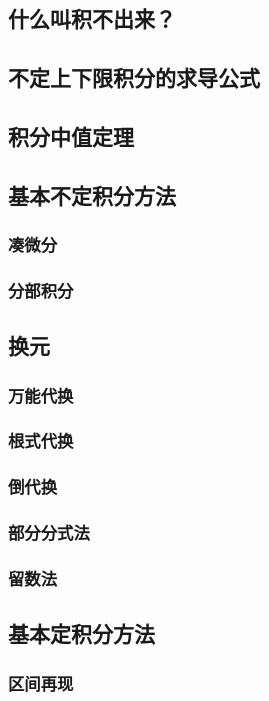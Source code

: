 \documentclass[lang=cn,newtx,10pt,scheme=chinese]{elegantbook}
\begin{document}
    \subsection{什么叫积不出来？}
    \subsection{不定上下限积分的求导公式}
    \subsection{积分中值定理}
    \subsection{基本不定积分方法}
    \subsubsection{凑微分}
    \subsubsection{分部积分}
    \subsection{换元}
    \subsubsection{万能代换}
    \subsubsection{根式代换}
    \subsubsection{倒代换}
    \subsubsection{部分分式法}
    \subsubsection{留数法}
    \subsection{基本定积分方法}
    \subsubsection{区间再现}
\end{document}
